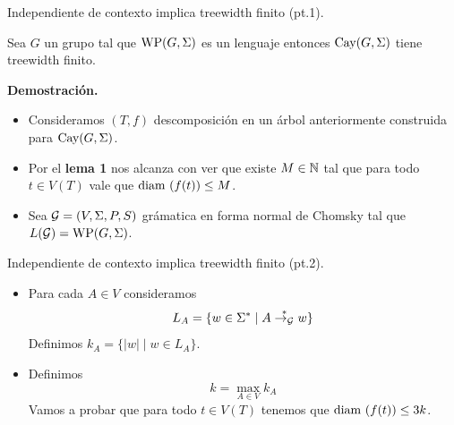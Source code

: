 \documentclass[aspectratio=169, 11pt]{beamer}
\begin{document}
	\begin{frame}[fragile]{Independiente de contexto implica treewidth finito (pt.1).}
		\begin{teo}
			Sea $G$ un grupo tal que $\text{WP}(G, \Sigma)$ es un lenguaje \ic{} entonces $\text{Cay}(G, \Sigma)$ tiene treewidth finito.
		\end{teo}
		\textbf{Demostración.}

			\begin{itemize}
				\item 
					Consideramos $(T,f)$  descomposición en un árbol anteriormente construida para $\text{Cay}(G, \Sigma)$.
				\item 
					Por el \textbf{lema  1} nos alcanza con ver que existe $M \in \mathbb{N}$ tal que para todo $t \in V(T)$ vale que $\text{diam}\ (f(t)) \le M$.
				\item 
					Sea ${\cal G} = (V, \Sigma, P, S)$ grámatica \ic{} en forma normal de Chomsky tal que $L({\cal G}) = \text{WP}(G, \Sigma)$.
			\end{itemize}
	\end{frame}

	\begin{frame}[fragile]{Independiente de contexto implica treewidth finito (pt.2).}
		
		\begin{itemize}
			\item 
				Para cada $A \in V$ consideramos 
				\[
					L_{A} = \{ w \in \Sigma^{*} \mid A \overset{*}{\to_{\cal G}} w \}
				\]
				Definimos $k_{A} = \{ |w| \mid w \in L_{A} \}$.
				
			\item 
				Definimos 
				\[
					k = \max_{A \in V} k_{A}	
				\]
				Vamos a probar que para todo $t \in V(T)$ tenemos que $\text{diam}\ (f(t)) \le 3k$.
		\end{itemize}
	\end{frame}
\end{document}

